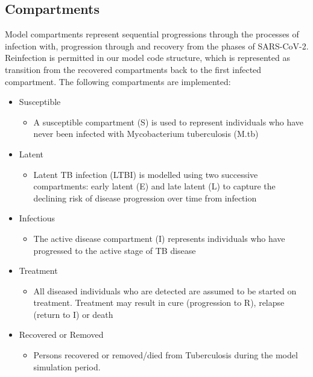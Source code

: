 \subsection{Compartments}
Model compartments represent sequential progressions through the processes of infection with, progression through and recovery from the phases of SARS-CoV-2.
Reinfection is permitted in our model code structure, which is represented as transition from the recovered compartments back to the first infected compartment.
The following compartments are implemented:
\begin{itemize}
    \item Susceptible
    \begin{itemize}
        \item A susceptible compartment (S) is used to represent individuals who have never been infected with Mycobacterium tuberculosis (M.tb)
    \end{itemize}
    \item Latent
    \begin{itemize}
        \item Latent TB infection (LTBI) is modelled using two successive compartments: early latent (E) and late latent (L) to capture the declining risk of disease progression over time from infection
    \end{itemize}
    \item Infectious
    \begin{itemize}
        \item The active disease compartment (I) represents individuals who have progressed to the active stage of TB disease
    \end{itemize}
    \item Treatment
    \begin{itemize}
        \item All diseased individuals who are detected are assumed to be started on treatment. Treatment may result in cure (progression to R), relapse (return to I) or death
    \end{itemize}
    \item Recovered or Removed
    \begin{itemize}
        \item Persons recovered or removed/died from Tuberculosis during the model simulation period.
    \end{itemize}
\end{itemize}
